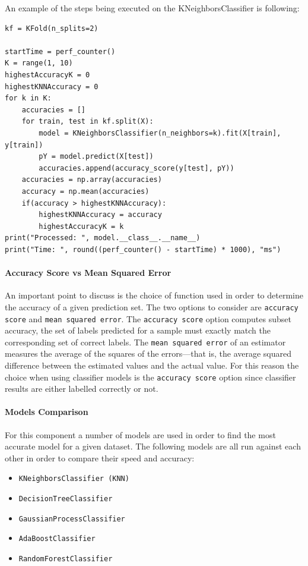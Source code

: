 An example of the steps being executed on the KNeighborsClassifier is following:
\begin{lstlisting}[caption=KNeighborsClassifier Example]
kf = KFold(n_splits=2)

startTime = perf_counter()
K = range(1, 10)
highestAccuracyK = 0
highestKNNAccuracy = 0
for k in K:
    accuracies = []
    for train, test in kf.split(X):
        model = KNeighborsClassifier(n_neighbors=k).fit(X[train], y[train])
        pY = model.predict(X[test])
        accuracies.append(accuracy_score(y[test], pY))
    accuracies = np.array(accuracies)
    accuracy = np.mean(accuracies)
    if(accuracy > highestKNNAccuracy):
        highestKNNAccuracy = accuracy
        highestAccuracyK = k
print("Processed: ", model.__class__.__name__)
print("Time: ", round((perf_counter() - startTime) * 1000), "ms")
\end{lstlisting}

\paragraph{Accuracy Score vs Mean Squared Error}

An important point to discuss is the choice of function used in order to determine the accuracy of a given prediction set. The two options to consider are \verb|accuracy score| and \verb|mean squared error|. The \verb|accuracy score| option computes subset accuracy, the set of labels predicted for a sample must exactly match the corresponding set of correct labels. The \verb|mean squared error| of an estimator measures the average of the squares of the errors—that is, the average squared difference between the estimated values and the actual value. For this reason the choice when using classifier models is the \verb|accuracy score| option since classifier results are either labelled correctly or not.

\paragraph{Models Comparison}

For this component a number of models are used in order to find the most accurate model for a given dataset. The following models are all run against each other in order to compare their speed and accuracy:
\begin{itemize}
    \item \texttt{KNeighborsClassifier (KNN)}
    \item \texttt{DecisionTreeClassifier}
    \item \texttt{GaussianProcessClassifier}
    \item \texttt{AdaBoostClassifier}
    \item \texttt{RandomForestClassifier}
\end{itemize}

